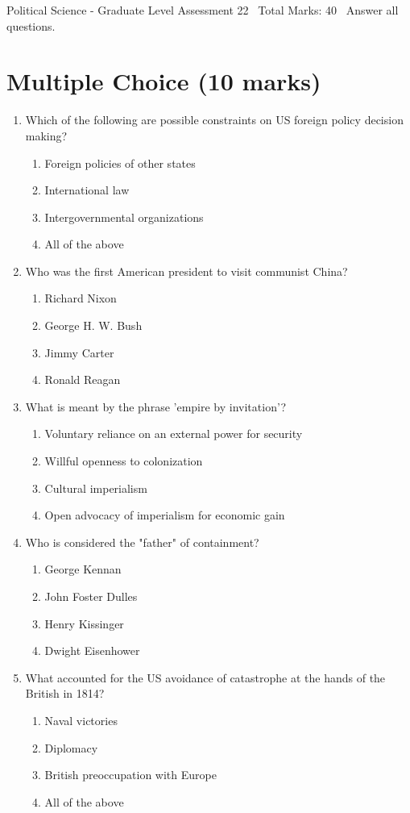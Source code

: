 \documentclass[12pt]{article}
\begin{document}
\begin{center}
Political Science - Graduate Level Assessment 22 \
Total Marks: 40 \
Answer all questions.
\end{center}

\section*{Multiple Choice (10 marks)}
\begin{enumerate}[label=\arabic*.]
\item Which of the following are possible constraints on US foreign policy decision making?
\begin{enumerate}[label=(\alph*)]
    \item Foreign policies of other states
    \item International law
    \item Intergovernmental organizations
    \item All of the above
\end{enumerate}
\item Who was the first American president to visit communist China?
\begin{enumerate}[label=(\alph*)]
    \item Richard Nixon
    \item George H. W. Bush
    \item Jimmy Carter
    \item Ronald Reagan
\end{enumerate}
\item What is meant by the phrase 'empire by invitation'?
\begin{enumerate}[label=(\alph*)]
    \item Voluntary reliance on an external power for security
    \item Willful openness to colonization
    \item Cultural imperialism
    \item Open advocacy of imperialism for economic gain
\end{enumerate}
\item Who is considered the "father" of containment?
\begin{enumerate}[label=(\alph*)]
    \item George Kennan
    \item John Foster Dulles
    \item Henry Kissinger
    \item Dwight Eisenhower
\end{enumerate}
\item What accounted for the US avoidance of catastrophe at the hands of the British in 1814?
\begin{enumerate}[label=(\alph*)]
    \item Naval victories
    \item Diplomacy
    \item British preoccupation with Europe
    \item All of the above
\end{enumerate}
\end{enumerate}
\end{document}
